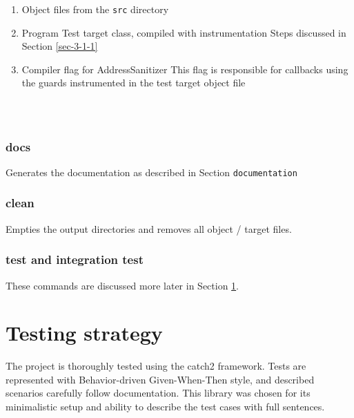 \documentclass{elteikthesis}[2018/06/06]
\newcommand*{\code}{\lstinline[keywordstyle=\color{violet}, basicstyle=\color{violet}]}
\begin{document}
\begin{enumerate}
\item Object files from the \code{src} directory
\label{sec-3-2-3-1-1}
\item Program Test target class, compiled with instrumentation
\label{sec-3-2-3-1-2}
Steps discussed in Section \ref{sec-3-1-1} \\
\item Compiler flag for AddressSanitizer
\label{sec-3-2-3-1-3}
This flag is responsible for callbacks using the guards instrumented in the test target object file \\

\begin{listing}
\caption{\label{Makefile-main}compilation commands for \code{bin/main} in \code{Makefile}}
\inputminted[firstline=47,lastline=60,breaklines]{bash}{Makefile} \\
\end{listing}
\end{enumerate}

\subsubsection{docs}
\label{sec-3-2-3-2}
Generates the documentation as described in Section \texttt{documentation} \\
\subsubsection{clean}
\label{sec-3-2-3-3}
Empties the output directories and removes all object / target files. \\
\subsubsection{test and integration test}
\label{sec-3-2-3-4}
These commands are discussed more later in Section \ref{sec-3-3}. \\
\section{Testing strategy}
\label{sec-3-3}
The project is thoroughly tested using the catch2 framework. Tests are represented with Behavior-driven Given-When-Then style, and described scenarios carefully follow documentation. This library was chosen for its minimalistic setup and ability to describe the test cases with full sentences. \\
\end{document}
